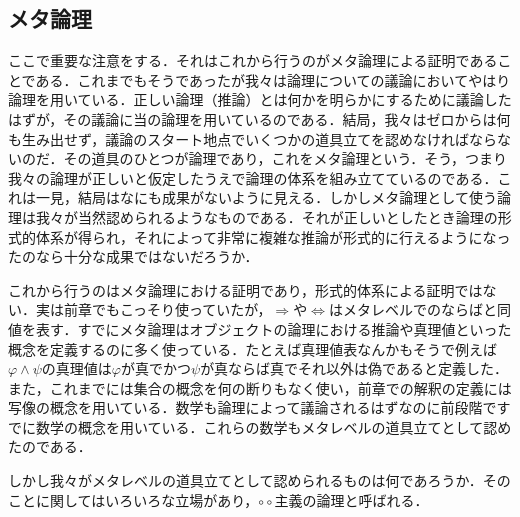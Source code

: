 \documentclass[10pt,b5paper,papersize,dvipdfmx]{jsbook}
\begin{document}
\subsection{メタ論理}
ここで重要な注意をする．それはこれから行うのがメタ論理による証明であることである．これまでもそうであったが我々は論理についての議論においてやはり論理を用いている．正しい論理（推論）とは何かを明らかにするために議論したはずが，その議論に当の論理を用いているのである．結局，我々はゼロからは何も生み出せず，議論のスタート地点でいくつかの道具立てを認めなければならないのだ．その道具のひとつが論理であり，これをメタ論理という．そう，つまり我々の論理が正しいと仮定したうえで論理の体系を組み立てているのである．これは一見，結局はなにも成果がないように見える．しかしメタ論理として使う論理は我々が当然認められるようなものである．それが正しいとしたとき論理の形式的体系が得られ，それによって非常に複雑な推論が形式的に行えるようになったのなら十分な成果ではないだろうか．\par
これから行うのはメタ論理における証明であり，形式的体系による証明ではない．実は前章でもこっそり使っていたが，$\Rightarrow$や$\Leftrightarrow$はメタレベルでのならばと同値を表す．すでにメタ論理はオブジェクトの論理における推論や真理値といった概念を定義するのに多く使っている．たとえば真理値表なんかもそうで例えば$\varphi \land \psi$の真理値は$\varphi$が真でかつ$\psi$が真ならば真でそれ以外は偽であると定義した．また，これまでには集合の概念を何の断りもなく使い，前章での解釈の定義には写像の概念を用いている．数学も論理によって議論されるはずなのに前段階ですでに数学の概念を用いている．これらの数学もメタレベルの道具立てとして認めたのである．\par
しかし我々がメタレベルの道具立てとして認められるものは何であろうか．そのことに関してはいろいろな立場があり，$\circ \circ$主義の論理と呼ばれる．\par
\end{document}
